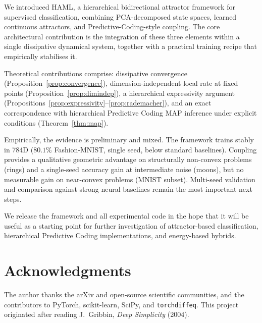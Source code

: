 \documentclass[11pt,a4paper]{article}
\begin{document}
We introduced HAML, a hierarchical bidirectional attractor framework for supervised
classification, combining PCA-decomposed state spaces, learned continuous attractors, and
Predictive-Coding-style coupling. The core architectural contribution is the integration
of these three elements within a single dissipative dynamical system, together with a
practical training recipe that empirically stabilises it.

Theoretical contributions comprise: dissipative convergence (Proposition~\ref{prop:convergence}),
dimension-independent local rate at fixed points (Proposition~\ref{prop:dimindep}),
a hierarchical expressivity argument (Propositions~\ref{prop:expressivity}--\ref{prop:rademacher}),
and an exact correspondence with hierarchical Predictive Coding MAP inference under
explicit conditions (Theorem~\ref{thm:map}).

Empirically, the evidence is preliminary and mixed. The framework trains stably in 784D
($80.1\%$ Fashion-MNIST, single seed, below standard baselines). Coupling provides a
qualitative geometric advantage on structurally non-convex problems (rings) and a
single-seed accuracy gain at intermediate noise (moons), but no measurable gain on
near-convex problems (MNIST subset). Multi-seed validation and comparison against strong
neural baselines remain the most important next steps.

We release the framework and all experimental code in the hope that it will be useful as
a starting point for further investigation of attractor-based classification, hierarchical
Predictive Coding implementations, and energy-based hybrids.

\section*{Acknowledgments}

The author thanks the arXiv and open-source scientific communities, and the contributors
to PyTorch, scikit-learn, SciPy, and \texttt{torchdiffeq}. This project originated after
reading J.~Gribbin, \textit{Deep Simplicity} (2004).
\end{document}
